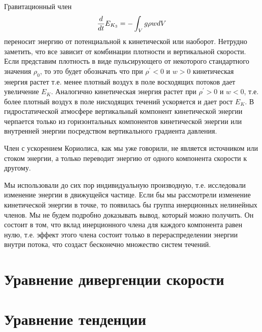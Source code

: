 Гравитационный член
\begin{equation*}
    \displaystyle\frac{d }{d t}E_{K_3} = -\int_V g\rho w dV
\end{equation*}
переносит энергию от потенциальной к кинетической или наоборот. Нетрудно заметить, что все зависит от комбинации плотности и вертикальной скорости. Если представим плотность в виде пульсирующего от некоторого стандартного значения $\rho_0$, то это будет обозначать что при $\rho^{'}<0$ и $w>0$ кинетическая энергия растет т.е. менее плотный воздух в поле восходящих потоков дает увеличение $E_K$. Аналогично кинетическая энергия растет при $\rho^{'}>0$ и $w<0$, т.е. более плотный воздух в поле нисходящих течений ускоряется и дает рост $E_K$. В гидростатической атмосфере вертикальный компонент кинетической энергии черпается только из горизонтальных компонентов кинетической энергии или внутренней энергии посредством вертикального градиента давления.


Член с ускорением Кориолиса, как мы уже говорили, не является источником или стоком энергии, а только переводит энергию от одного компонента скорости к другому.

Мы использовали до сих пор индивидуальную производную, т.е. исследовали изменение энергии в движущейся частице. Если бы мы рассмотрели изменение кинетической энергии в точке, то появилась бы группа инерционных нелинейных членов. Мы не будем подробно доказывать вывод, который можно получить. Он состоит в том, что вклад инерционного члена для каждого компонента равен нулю, т.е. эффект этого члена состоит только в перераспределении энергии внутри потока, что создаст бесконечно множество систем течений. 



\section{Уравнение дивергенции скорости}

\section{Уравнение тенденции}

